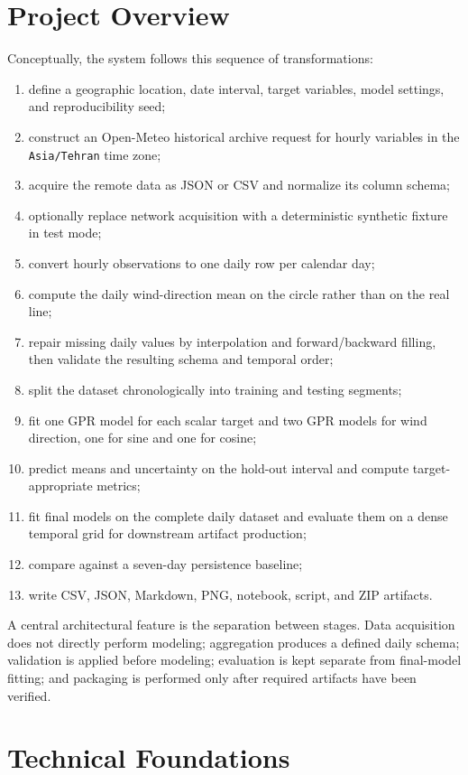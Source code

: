 \documentclass[11pt,a4paper]{article}
\newcommand{\code}[1]{\texttt{#1}}
\begin{document}
\section{Project Overview}
Conceptually, the system follows this sequence of transformations:
\begin{enumerate}
  \item define a geographic location, date interval, target variables, model settings, and reproducibility seed;
  \item construct an Open-Meteo historical archive request for hourly variables in the \code{Asia/Tehran} time zone;
  \item acquire the remote data as JSON or CSV and normalize its column schema;
  \item optionally replace network acquisition with a deterministic synthetic fixture in test mode;
  \item convert hourly observations to one daily row per calendar day;
  \item compute the daily wind-direction mean on the circle rather than on the real line;
  \item repair missing daily values by interpolation and forward/backward filling, then validate the resulting schema and temporal order;
  \item split the dataset chronologically into training and testing segments;
  \item fit one GPR model for each scalar target and two GPR models for wind direction, one for sine and one for cosine;
  \item predict means and uncertainty on the hold-out interval and compute target-appropriate metrics;
  \item fit final models on the complete daily dataset and evaluate them on a dense temporal grid for downstream artifact production;
  \item compare against a seven-day persistence baseline;
  \item write CSV, JSON, Markdown, PNG, notebook, script, and ZIP artifacts.
\end{enumerate}

A central architectural feature is the separation between stages. Data acquisition does not directly perform modeling; aggregation produces a defined daily schema; validation is applied before modeling; evaluation is kept separate from final-model fitting; and packaging is performed only after required artifacts have been verified.

\section{Technical Foundations}
\end{document}
